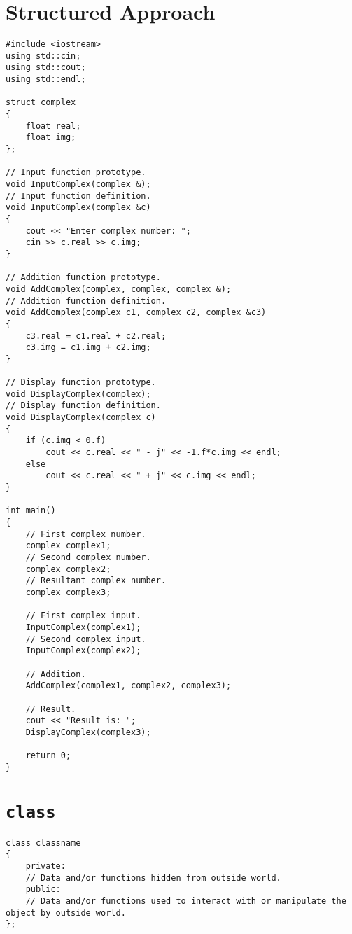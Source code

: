 \documentclass[12pt,a4paper]{article}
\begin{document}
\section{Structured Approach}
\begin{lstlisting}[caption={Using \texttt{struct} to define complex number and add them using functions}]
#include <iostream>
using std::cin;
using std::cout;
using std::endl;

struct complex
{
	float real;
	float img;
};

// Input function prototype.
void InputComplex(complex &);
// Input function definition.
void InputComplex(complex &c)
{
	cout << "Enter complex number: ";
	cin >> c.real >> c.img;
}

// Addition function prototype.
void AddComplex(complex, complex, complex &);
// Addition function definition.
void AddComplex(complex c1, complex c2, complex &c3)
{
	c3.real = c1.real + c2.real;
	c3.img = c1.img + c2.img;
}

// Display function prototype.
void DisplayComplex(complex);
// Display function definition.
void DisplayComplex(complex c)
{
	if (c.img < 0.f)
		cout << c.real << " - j" << -1.f*c.img << endl;
	else
		cout << c.real << " + j" << c.img << endl;
}

int main()
{
	// First complex number.
	complex complex1;
	// Second complex number.
	complex complex2;
	// Resultant complex number.
	complex complex3;
	
	// First complex input.
	InputComplex(complex1);
	// Second complex input.
	InputComplex(complex2);
	
	// Addition.
	AddComplex(complex1, complex2, complex3);
	
	// Result.
	cout << "Result is: ";
	DisplayComplex(complex3);
	
	return 0;
}
\end{lstlisting}
\section{\texttt{class}}
\begin{lstlisting}[caption={\texttt{class} definition}]
class classname
{
	private:
	// Data and/or functions hidden from outside world.
	public:
	// Data and/or functions used to interact with or manipulate the object by outside world.	
};
\end{lstlisting}
\end{document}
